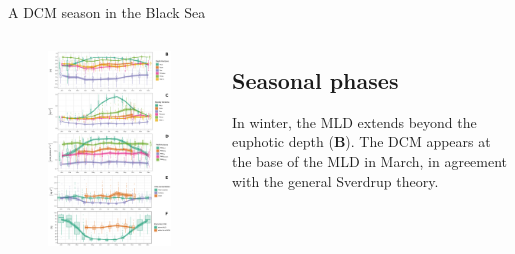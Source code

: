 \documentclass[final]{beamer}
\begin{document}
\begin{frame}[fragile]
\begin{columns}[T]
\begin{column}{.64\textwidth}
\begin{block}{ A DCM season in the Black Sea }
\begin{columns}[T]
	    \begin{column}{.33\textwidth}
		    \begin{figure}
     		    \includegraphics[width=\columnwidth]{figs/FIG5-G.png}
		    \end{figure}
	    \end{column}

	    \begin{column}{.42\textwidth}
	    \subsection{Seasonal phases}

\alert{In winter}, the MLD extends beyond the euphotic depth (\textbf{B}).
The DCM appears at the base of the MLD in March, in agreement with the general Sverdrup theory.\\


\end{column}
\end{columns}
\end{block}
\end{column}
\end{columns}
\end{frame}
\end{document}
